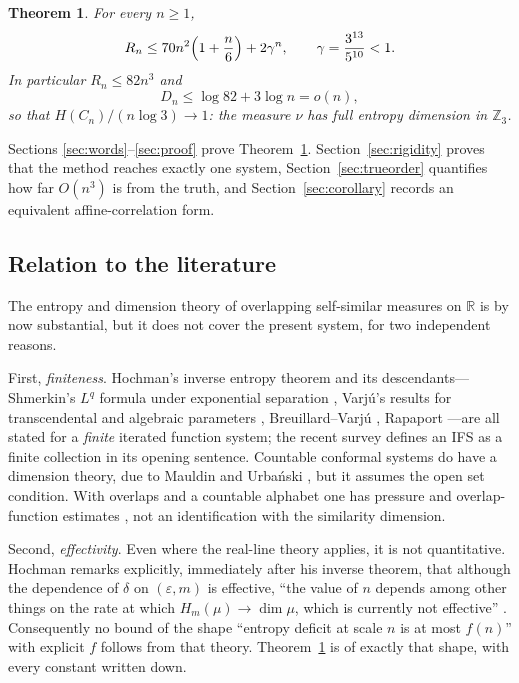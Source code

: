 \documentclass[11pt,reqno]{amsart}
\theoremstyle{plain}
\newtheorem{theorem}{Theorem}[section]
\theoremstyle{definition}
\theoremstyle{remark}
\newcommand{\Zthree}{\mathbb{Z}_3}
\begin{document}
\begin{theorem}\label{thm:main}
For every $n\ge1$,
\begin{equation}
R_n\le70n^2\Bigl(1+\frac n6\Bigr)+2\gamma^n,
\qquad \gamma=\frac{3^{13}}{5^{10}}<1 .
\label{eq:mainbound}
\end{equation}
In particular $R_n\le82n^3$ and
\begin{equation}
D_n\le\log82+3\log n=o(n),
\label{eq:deficit}
\end{equation}
so that $H(C_n)/(n\log3)\to1$: the measure $\nu$ has full entropy dimension
in $\Zthree$.
\end{theorem}

Sections \ref{sec:words}--\ref{sec:proof} prove Theorem~\ref{thm:main}.
Section~\ref{sec:rigidity} proves that the method reaches exactly one
system, Section~\ref{sec:trueorder} quantifies how far $O(n^3)$ is from the
truth, and Section~\ref{sec:corollary} records an equivalent
affine-correlation form.

\subsection{Relation to the literature}
The entropy and dimension theory of overlapping self-similar measures on
$\mathbb R$ is by now substantial, but it does not cover the present
system, for two independent reasons.

First, \emph{finiteness}. Hochman's inverse entropy theorem \cite{Hochman14}
and its descendants---Shmerkin's $L^q$ formula under exponential separation
\cite{Shmerkin19}, Varj\'u's results for transcendental and algebraic
parameters \cite{Varju19ann,Varju19jams}, Breuillard--Varj\'u
\cite{BV19,BV20}, Rapaport \cite{Rapaport}---are all stated for a
\emph{finite} iterated function system; the recent survey \cite{Varju25}
defines an IFS as a finite collection in its opening sentence. Countable
conformal systems do have a dimension theory, due to Mauldin and Urba\'nski
\cite{MU96}, but it assumes the open set condition. With overlaps and a
countable alphabet one has pressure and overlap-function estimates
\cite{MihUrb13,MihUrb16}, not an identification with the similarity
dimension.

Second, \emph{effectivity}. Even where the real-line theory applies, it is
not quantitative. Hochman remarks explicitly, immediately after his
inverse theorem, that although the dependence of $\delta$ on $(\varepsilon,m)$
is effective, ``the value of $n$ depends among other things on the rate at
which $H_m(\mu)\to\dim\mu$, which is currently not effective''
\cite[\S2]{Hochman14}. Consequently no bound of the shape ``entropy deficit
at scale $n$ is at most $f(n)$'' with explicit $f$ follows from that theory.
Theorem~\ref{thm:main} is of exactly that shape, with every constant
written down.
\end{document}
